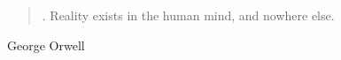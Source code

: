 \begin{quotation}
	.	Reality exists in the human mind, and nowhere else.
\end{quotation}
	George Orwell